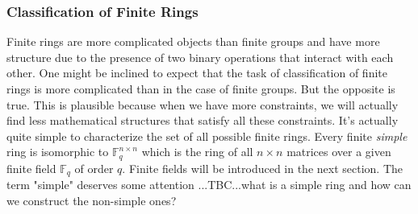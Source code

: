 



\subsubsection{Classification of Finite Rings}
Finite rings are more complicated objects than finite groups and have more structure due to the presence of two binary operations that interact with each other. One might be inclined to expect that the task of classification of finite rings is more complicated than in the case of finite groups. But the opposite is true. This is plausible because when we have more constraints, we will actually find less mathematical structures that satisfy all these constraints. It's actually quite simple to characterize the set of all possible finite rings. Every finite \emph{simple} ring is isomorphic to $\mathbb{F}_q^{n \times n}$ which is the ring of all $n \times n$ matrices over a given finite field $\mathbb{F}_q$ of order $q$. Finite fields will be introduced in the next section. The term "simple" deserves some attention ...TBC...what is a simple ring and how can we construct the non-simple ones?



